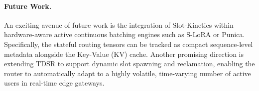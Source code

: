 \paragraph{Future Work.}
An exciting avenue of future work is the integration of Slot-Kinetics within hardware-aware active continuous batching engines such as S-LoRA or Punica. Specifically, the stateful routing tensors can be tracked as compact sequence-level metadata alongside the Key-Value (KV) cache. Another promising direction is extending TDSR to support dynamic slot spawning and reclamation, enabling the router to automatically adapt to a highly volatile, time-varying number of active users in real-time edge gateways.